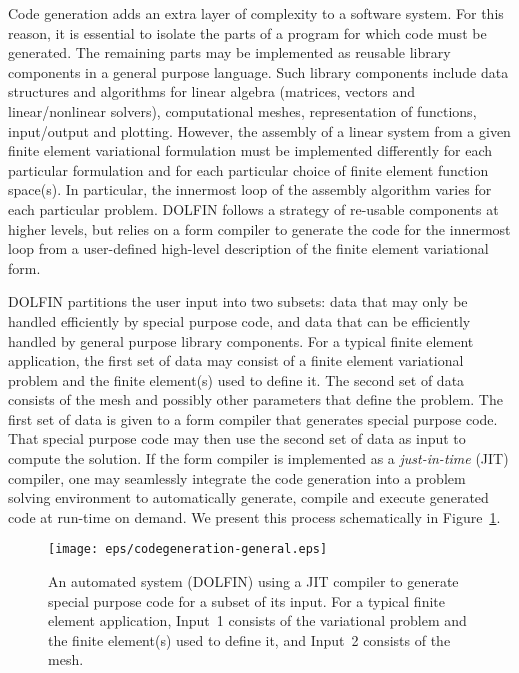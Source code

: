 \documentclass[acmtoms]{acmtrans2m}
\newcommand{\dolfin}{DOLFIN}
\begin{document}
Code generation adds an extra layer of complexity to a software
system. For this reason, it is essential to isolate the parts of a
program for which code must be generated. The remaining parts may be
implemented as reusable library components in a general purpose
language. Such library components include data structures and
algorithms for linear algebra (matrices, vectors and linear/nonlinear
solvers), computational meshes, representation of functions,
input/output and plotting. However, the assembly of a linear system
from a given finite element variational formulation must be
implemented differently for each particular formulation and for each
particular choice of finite element function space(s). In particular,
the innermost loop of the assembly algorithm varies for each
particular problem. \dolfin{} follows a strategy of re-usable
components at higher levels, but relies on a form compiler to generate
the code for the innermost loop from a user-defined high-level
description of the finite element variational form.

\dolfin{} partitions the user input into two subsets: data that may
only be handled efficiently by special purpose code, and data that can
be efficiently handled by general purpose library
components. For a typical finite element application, the first set of
data may consist of a finite element variational problem and the
finite element(s) used to define it. The second set of data consists
of the mesh and possibly other parameters that define the problem. The
first set of data is given to a form compiler that generates special
purpose code. That special purpose code may then use the second set of
data as input to compute the solution. If the form compiler is
implemented as a \emph{just-in-time} (JIT) compiler, one may
seamlessly integrate the code generation into a problem solving
environment to automatically generate, compile and execute generated
code at run-time on demand. We present this process schematically in
Figure~\ref{fig:codegeneration}.
\begin{figure}
  \begin{center}
    \texttt{[image: eps/codegeneration-general.eps]}
    \caption{An automated system (\dolfin{}) using a JIT compiler
      to generate special purpose code for a subset of
      its input. For a typical finite element application, Input~1
      consists of the variational problem and the finite element(s)
      used to define it, and Input~2 consists of the mesh.}
    \label{fig:codegeneration}
  \end{center}
\end{figure}
\end{document}
